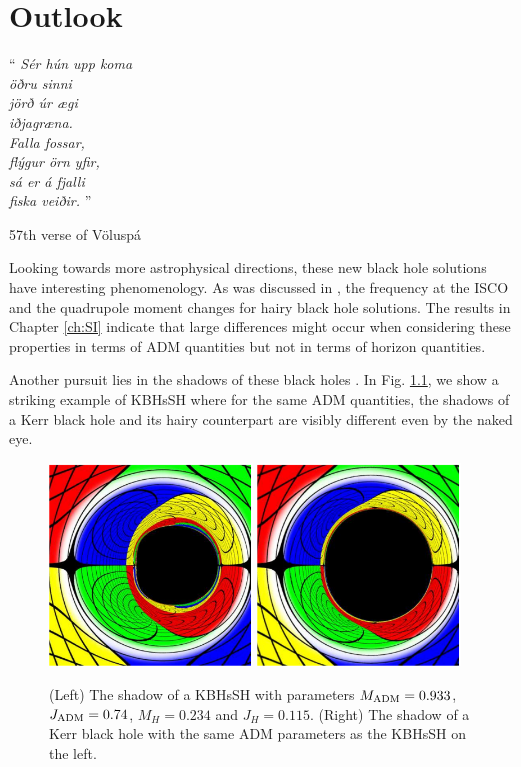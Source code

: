 \chapter{Outlook}
\label{ch:outlook}

\epigraph{``\emph{
Sér hún upp koma \\
öðru sinni \\
jörð úr ægi \\
iðjagræna. \\
Falla fossar, \\
flýgur örn yfir, \\
sá er á fjalli \\
fiska veiðir. 
} 
''}{57th verse of Völuspá}

Looking towards more astrophysical directions, these new black hole solutions have interesting phenomenology.
As was discussed in \cite{Herdeiro:2014goa,Herdeiro:2015gia}, the frequency at the ISCO and the quadrupole moment changes for hairy black hole solutions.
The results in Chapter \ref{ch:SI} indicate that large differences might occur when considering these properties in terms of ADM quantities but not in terms of horizon quantities.

Another pursuit lies in the shadows of these black holes \cite{Cunha:2015yba,Cunha:2016bjh}.
In Fig. \ref{shadows}, we show a striking example of KBHsSH where for the same ADM quantities, the shadows of a Kerr black hole and its hairy counterpart are visibly different even by the naked eye.

\begin{figure}[h!]
\centering
  \includegraphics[width=0.48\textwidth]{Figs/skuggi2a.pdf}
  \includegraphics[width=0.48\textwidth]{Figs/skuggi2b.pdf}
  \caption{(Left) The shadow of a KBHsSH with parameters $M_{\rm ADM}=0.933$, $J_{\rm ADM}=0.74$, $M_H=0.234$ and $J_H=0.115$. (Right) The shadow of a Kerr black hole with the same ADM parameters as the KBHsSH on the left.}
\label{shadows}
\end{figure}

